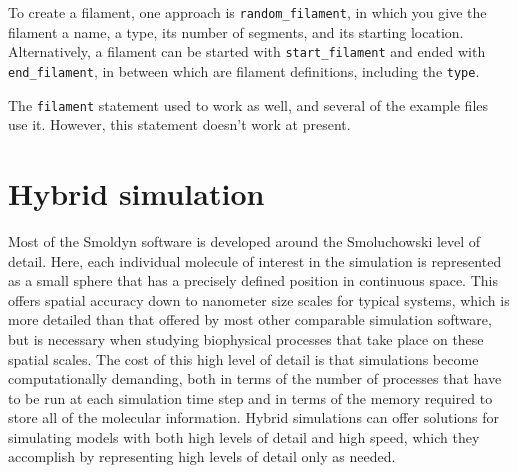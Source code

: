 \documentclass {scrbook}
\newcommand {\ttt} {\texttt}
\begin{document}
To create a filament, one approach is \ttt{random\_filament}, in which you give the filament a name, a type, its number of segments, and its starting location. Alternatively, a filament can be started with \ttt{start\_filament} and ended with \ttt{end\_filament}, in between which are filament definitions, including the \ttt{type}.

The \ttt{filament} statement used to work as well, and several of the example files use it. However, this statement doesn't work at present.




\chapter{Hybrid simulation}

Most of the Smoldyn software is developed around the Smoluchowski level of detail. Here, each individual molecule of interest in the simulation is represented as a small sphere that has a precisely defined position in continuous space. This offers spatial accuracy down to nanometer size scales for typical systems, which is more detailed than that offered by most other comparable simulation software, but is necessary when studying biophysical processes that take place on these spatial scales. The cost of this high level of detail is that simulations become computationally demanding, both in terms of the number of processes that have to be run at each simulation time step and in terms of the memory required to store all of the molecular information. Hybrid simulations can offer solutions for simulating models with both high levels of detail and high speed, which they accomplish by representing high levels of detail only as needed.
\end{document}
